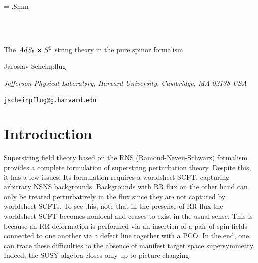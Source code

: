 \documentclass[12pt]{article}
\numberwithin{equation}{section}
\renewcommand{\title}[1]{\vbox{\center\LARGE{#1}}\vspace{5mm}}
\renewcommand{\author}[1]{\vbox{\center#1}\vspace{5mm}}
\newcommand{\address}[1]{\vbox{\center\em#1}}
\newcommand{\email}[1]{\vbox{\center\tt#1}\vspace{5mm}}
\begin{document}
\unitlength = .8mm

\begin{titlepage}

\begin{center}

\hfill \\
\hfill \\
\vskip 1cm

\title{The $AdS_5 \cross S^5$ string theory in the pure spinor formalism}

\author{Jaroslav Scheinpflug}

\address{Jefferson Physical Laboratory, Harvard University,
Cambridge, MA 02138 USA
}

\email{jscheinpflug@g.harvard.edu}

\end{center}


\vfill

\end{titlepage}

\eject

\begingroup
\hypersetup{linkcolor=black}

\tableofcontents

\endgroup


\section{Introduction}
Superstring field theory based on the RNS (Ramond-Neveu-Schwarz) formalism provides a complete formulation of superstring perturbation theory. Despite this, it has a few issues. Its formulation requires a worldsheet SCFT, capturing arbitrary NSNS backgrounds. Backgrounds with RR flux on the other hand can only be treated perturbatively in the flux since they are not captured by worldsheet SCFTs. To see this, note that in the presence of RR flux the worldsheet SCFT becomes nonlocal and ceases to exist in the usual sense. This is because an RR deformation is performed via an insertion of a pair of spin fields connected to one another via a defect line together with a PCO. In the end, one can trace these difficulties to the absence of manifest target space supersymmetry. Indeed, the SUSY algebra closes only up to picture changing.
\end{document}
